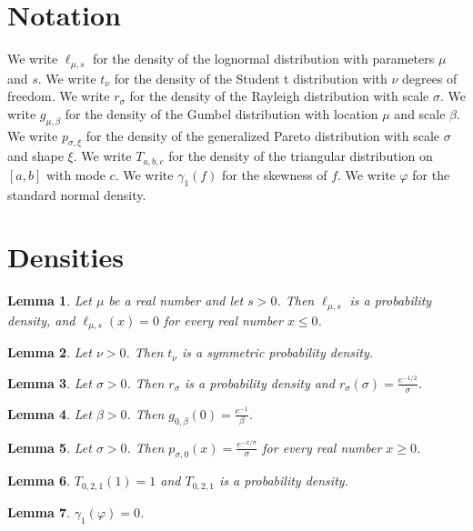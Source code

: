 \documentclass{article}
\newtheorem{lemma}{Lemma}
\begin{document}
\section{Notation}

We write $\ell_{\mu,s}$ for the density of the lognormal distribution with parameters $\mu$ and $s$.
We write $t_\nu$ for the density of the Student t distribution with $\nu$ degrees of freedom.
We write $r_\sigma$ for the density of the Rayleigh distribution with scale $\sigma$.
We write $g_{\mu,\beta}$ for the density of the Gumbel distribution with location $\mu$ and scale $\beta$.
We write $p_{\sigma,\xi}$ for the density of the generalized Pareto distribution with scale $\sigma$ and shape $\xi$.
We write $T_{a,b,c}$ for the density of the triangular distribution on $[a,b]$ with mode $c$.
We write $\gamma_1(f)$ for the skewness of $f$.
We write $\varphi$ for the standard normal density.

\section{Densities}

\begin{lemma}\label{lognormal}
Let $\mu$ be a real number and let $s>0$. Then $\ell_{\mu,s}$ is a probability density, and $\ell_{\mu,s}(x)=0$ for every real number $x\le0$.
\end{lemma}

\begin{lemma}\label{student}
Let $\nu>0$. Then $t_\nu$ is a symmetric probability density.
\end{lemma}

\begin{lemma}\label{rayleigh}
Let $\sigma>0$. Then $r_\sigma$ is a probability density and $r_\sigma(\sigma)=\frac{e^{-1/2}}{\sigma}$.
\end{lemma}

\begin{lemma}\label{gumbel}
Let $\beta>0$. Then $g_{0,\beta}(0)=\frac{e^{-1}}{\beta}$.
\end{lemma}

\begin{lemma}\label{pareto}
Let $\sigma>0$. Then $p_{\sigma,0}(x)=\frac{e^{-x/\sigma}}{\sigma}$ for every real number $x\ge0$.
\end{lemma}

\begin{lemma}\label{triangular}
$T_{0,2,1}(1)=1$ and $T_{0,2,1}$ is a probability density.
\end{lemma}

\begin{lemma}\label{skewness}
$\gamma_1(\varphi)=0$.
\end{lemma}
\end{document}
